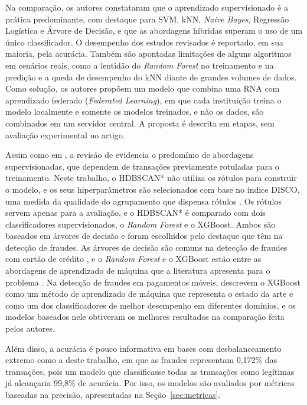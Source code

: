 \documentclass{uflamon}          %
\begin{document}
Na comparação, os autores constataram que o aprendizado supervisionado é a prática predominante, com destaque para SVM, kNN, \textit{Naive Bayes}, Regressão Logística e Árvore de Decisão, e que as abordagens híbridas superam o uso de um único classificador. O desempenho dos estudos revisados é reportado, em sua maioria, pela acurácia. Também são apontadas limitações de alguns algoritmos em cenários reais, como a lentidão do \textit{Random Forest} no treinamento e na predição e a queda de desempenho do kNN diante de grandes volumes de dados. Como solução, os autores propõem um modelo que combina uma RNA com aprendizado federado (\textit{Federated Learning}), em que cada instituição treina o modelo localmente e somente os modelos treinados, e não os dados, são combinados em um servidor central. A proposta é descrita em etapas, sem avaliação experimental no artigo.

Assim como em , a revisão de  evidencia o predomínio de abordagens supervisionadas, que dependem de transações previamente rotuladas para o treinamento. Neste trabalho, o HDBSCAN* não utiliza os rótulos para construir o modelo, e os seus hiperparâmetros são selecionados com base no índice DISCO, uma medida da qualidade do agrupamento que dispensa rótulos \cite{beer2025}. Os rótulos servem apenas para a avaliação, e o HDBSCAN* é comparado com dois classificadores supervisionados, o \textit{Random Forest} e o XGBoost. Ambos são baseados em árvores de decisão e foram escolhidos pelo destaque que têm na detecção de fraudes. As árvores de decisão são comuns na detecção de fraudes com cartão de crédito \cite{ngai2011}, e o \textit{Random Forest} e o XGBoost estão entre as abordagens de aprendizado de máquina que a literatura apresenta para o problema \cite{alarfaj2022}. Na detecção de fraudes em pagamentos móveis,  descrevem o XGBoost como um método de aprendizado de máquina que representa o estado da arte e como um dos classificadores de melhor desempenho em diferentes domínios, e os modelos baseados nele obtiveram os melhores resultados na comparação feita pelos autores.

Além disso, a acurácia é pouco informativa em bases com desbalanceamento extremo como a deste trabalho, em que as fraudes representam 0,172\% das transações, pois um modelo que classificasse todas as transações como legítimas já alcançaria 99,8\% de acurácia. Por isso, os modelos são avaliados por métricas baseadas na precisão, apresentadas na Seção~\ref{sec:metricas}.
\end{document}
